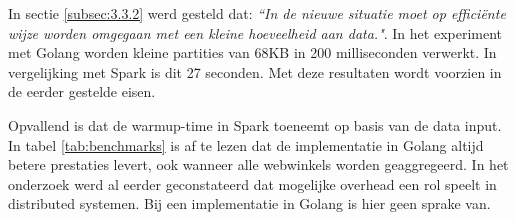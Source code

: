 In sectie \ref{subsec:3.3.2} werd gesteld dat: \textit{``In de nieuwe situatie moet op efficiënte wijze worden omgegaan met een kleine hoeveelheid aan data."}. In het experiment met Golang worden kleine partities van 68KB in 200 milliseconden verwerkt. In vergelijking met Spark is dit 27 seconden. Met deze resultaten wordt voorzien in de eerder gestelde eisen.

Opvallend is dat de warmup-time in Spark toeneemt op basis van de data input. In tabel \ref{tab:benchmarks} is af te lezen dat de implementatie in Golang altijd betere prestaties levert, ook wanneer alle webwinkels worden geaggregeerd. In het onderzoek werd al eerder geconstateerd dat mogelijke overhead een rol speelt in distributed systemen. Bij een implementatie in Golang is hier geen sprake van.

